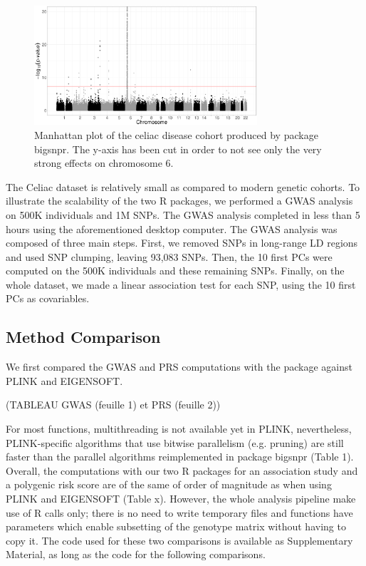 \documentclass{bioinfo}
\begin{document}
\begin{figure}[!tpb]
\centerline{\includegraphics[width=235pt]{celiac-gwas-cut}}
\caption{Manhattan plot of the celiac disease cohort produced by package bigsnpr. The y-axis has been cut in order to not see only the very strong effects on chromosome 6.}\label{fig:gwas}
\end{figure}

The Celiac dataset is relatively small as compared to modern genetic cohorts. To illustrate the scalability of the two R packages, we performed a GWAS analysis on 500K individuals and 1M SNPs. The GWAS analysis completed in less than 5 hours using the aforementioned desktop computer. The GWAS analysis was composed of three main steps. First, we removed SNPs in long-range LD regions and used SNP clumping, leaving 93,083 SNPs. Then, the 10 first PCs were computed on the 500K individuals and these remaining SNPs. Finally, on the whole dataset, we made a linear association test for each SNP, using the 10 first PCs as covariables.

\subsection{Method Comparison}

We first compared the GWAS and PRS computations with the package against PLINK and EIGENSOFT.

(TABLEAU GWAS (feuille 1) et PRS (feuille 2))

For most functions, multithreading is not available yet in PLINK, nevertheless, PLINK-specific algorithms that use bitwise parallelism (e.g. pruning) are still faster than the parallel algorithms reimplemented in package bigsnpr (Table 1). Overall, the computations with our two R packages for an association study and a polygenic risk score are of the same of order of magnitude as when using PLINK and EIGENSOFT (Table x). However, the whole analysis pipeline make use of R calls only; there is no need to write temporary files and functions have parameters which enable subsetting of the genotype matrix without having to copy it. The code used for these two comparisons is available as Supplementary Material, as long as the code for the following comparisons.
\end{document}
